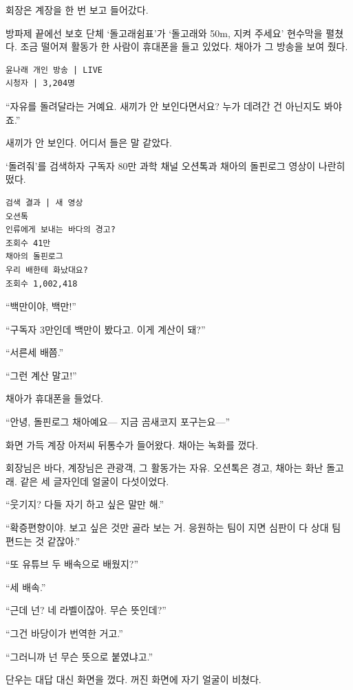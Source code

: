 \documentclass[
  korean,
  letterpaper,
  twoside,
  open=any,
  fontsize=12.5pt,
  headings=small]{scrbook}
\newcommand{\logfont}{\linespread{1}\fontsize{10.8}{15.2}\selectfont}
\begin{document}
회장은 계장을 한 번 보고
들어갔다.

방파제 끝에선 보호 단체
`돌고래쉼표'가 `돌고래와 50m,
지켜 주세요' 현수막을 펼쳤다.
조금 떨어져 활동가 한 사람이
휴대폰을 들고 있었다. 채아가
그 방송을 보여 줬다.

\begin{Verbatim}[samepage=true,frame=single,framesep=2.5mm,rulecolor=\color{gray},formatcom=\logfont]
윤나래 개인 방송 | LIVE
시청자 | 3,204명
\end{Verbatim}

``자유를 돌려달라는 거예요.
새끼가 안 보인다면서요? 누가
데려간 건 아닌지도 봐야죠.''

새끼가 안 보인다. 어디서 들은
말 같았다.

`돌려줘'를 검색하자 구독자
80만 과학 채널 오션톡과 채아의
돌핀로그 영상이 나란히 떴다.

\begin{Verbatim}[samepage=true,frame=single,framesep=2.5mm,rulecolor=\color{gray},formatcom=\logfont]
검색 결과 | 새 영상
오션톡
인류에게 보내는 바다의 경고?
조회수 41만
채아의 돌핀로그
우리 배한테 화났대요?
조회수 1,002,418
\end{Verbatim}

``백만이야, 백만!''

``구독자 3만인데 백만이
봤다고. 이게 계산이 돼?''

``서른세 배쯤.''

``그런 계산 말고!''

채아가 휴대폰을 들었다.

``안녕, 돌핀로그 채아예요---
지금 곰새코지 포구는요---''

화면 가득 계장 아저씨 뒤통수가
들어왔다. 채아는 녹화를 껐다.

회장님은 바다, 계장님은
관광객, 그 활동가는 자유.
오션톡은 경고, 채아는 화난
돌고래. 같은 세 글자인데
얼굴이 다섯이었다.

``웃기지? 다들 자기 하고 싶은
말만 해.''

``확증편향이야. 보고 싶은 것만
골라 보는 거. 응원하는 팀이
지면 심판이 다 상대 팀 편드는
것 같잖아.''

``또 유튜브 두 배속으로
배웠지?''

``세 배속.''

``근데 넌? 네 라벨이잖아. 무슨
뜻인데?''

``그건 바당이가 번역한 거고.''

``그러니까 넌 무슨 뜻으로
붙였냐고.''

단우는 대답 대신 화면을 껐다.
꺼진 화면에 자기 얼굴이
비쳤다.
\end{document}
